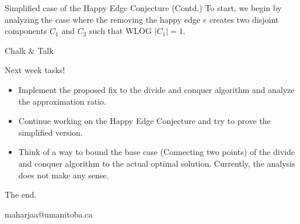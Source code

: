 \documentclass[11pt]{beamer}
\makeatletter
\newcommand{\email}{maharjaa@umanitoba.ca}
\makeatother
\begin{document}
\begin{frame}{Simplified case of the Happy Edge Conjecture (Contd.)}
	To start, we begin by analyzing the case where the removing the happy edge $e$ creates two disjoint components $C_1$ and $C_2$ such that WLOG $|C_1| = 1$.

	\begin{center}
		Chalk \& Talk
	\end{center}
\end{frame}

\begin{frame}{Next week tasks!}
	\begin{itemize}
		\item Implement the proposed fix to the divide and conquer algorithm and analyze the approximation ratio.
		\item Continue working on the Happy Edge Conjecture and try to prove the simplified version.
		\item Think of a way to bound the base case (Connecting two points) of the divide and conquer algorithm to the actual optimal solution. Currently, the analysis does not make any sense.
	\end{itemize}
\end{frame}

% 	

\begin{frame}
	\begin{center}
		The end.

		\email
	\end{center}
\end{frame}
\end{document}
